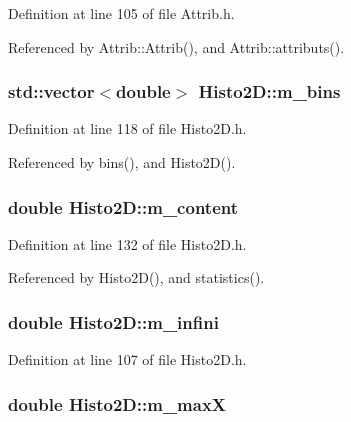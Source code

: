 Definition at line 105 of file Attrib.h.

Referenced by Attrib::Attrib(), and Attrib::attributs().\hypertarget{classHisto2D_a84f6c03673499f34b981cdebf69d22aa}{
\subsubsection[{m\_\-bins}]{\setlength{\rightskip}{0pt plus 5cm}std::vector$<$double$>$ {\bf Histo2D::m\_\-bins}}}
\label{classHisto2D_a84f6c03673499f34b981cdebf69d22aa}


Definition at line 118 of file Histo2D.h.

Referenced by bins(), and Histo2D().\hypertarget{classHisto2D_ab70be93148e5c9b24e48b60c6b3b5f89}{
\subsubsection[{m\_\-content}]{\setlength{\rightskip}{0pt plus 5cm}double {\bf Histo2D::m\_\-content}}}
\label{classHisto2D_ab70be93148e5c9b24e48b60c6b3b5f89}


Definition at line 132 of file Histo2D.h.

Referenced by Histo2D(), and statistics().\hypertarget{classHisto2D_a3763bdf81d08ba44aa56c0e85de95ff3}{
\subsubsection[{m\_\-infini}]{\setlength{\rightskip}{0pt plus 5cm}double {\bf Histo2D::m\_\-infini}}}
\label{classHisto2D_a3763bdf81d08ba44aa56c0e85de95ff3}


Definition at line 107 of file Histo2D.h.\hypertarget{classHisto2D_af428efc9b984006eeba1a216f7d15d6d}{
\subsubsection[{m\_\-maxX}]{\setlength{\rightskip}{0pt plus 5cm}double {\bf Histo2D::m\_\-maxX}}}
\label{classHisto2D_af428efc9b984006eeba1a216f7d15d6d}


